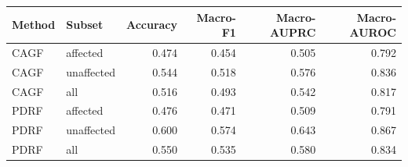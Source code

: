\begin{tabular}{llrrrr}
\toprule
Method & Subset & Accuracy & Macro-F1 & Macro-AUPRC & Macro-AUROC\\
\midrule
CAGF & affected & 0.474 & 0.454 & 0.505 & 0.792\\
CAGF & unaffected & 0.544 & 0.518 & 0.576 & 0.836\\
CAGF & all & 0.516 & 0.493 & 0.542 & 0.817\\
PDRF & affected & 0.476 & 0.471 & 0.509 & 0.791\\
PDRF & unaffected & 0.600 & 0.574 & 0.643 & 0.867\\
PDRF & all & 0.550 & 0.535 & 0.580 & 0.834\\
\bottomrule
\end{tabular}

